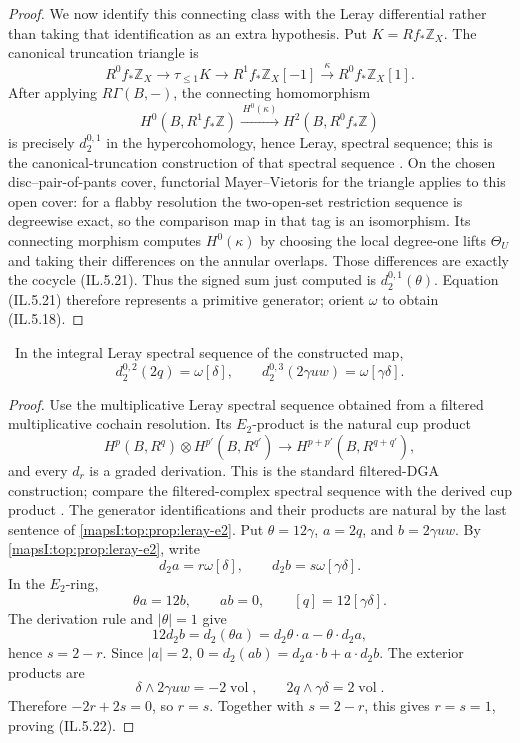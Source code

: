 \begin{proof}
We now identify this connecting class with the Leray differential rather
than taking that identification as an extra hypothesis.  Put
\(K=Rf_*\mathbb Z_X\).  The canonical truncation triangle
\cite[Tag~08J5]{StacksProject} is
\[
 R^0f_*\mathbb Z_X\longrightarrow\tau_{\le1}K
 \longrightarrow R^1f_*\mathbb Z_X[-1]
 \xrightarrow{\ \kappa\ }R^0f_*\mathbb Z_X[1].
\tag{IL.5.21a}
\]
After applying \(R\Gamma(B,-)\), the connecting homomorphism
\[
 H^0(B,R^1f_*\mathbb Z)\xrightarrow{\,H^0(\kappa)\,}
 H^2(B,R^0f_*\mathbb Z)
\tag{IL.5.21b}
\]
is precisely \(d_2^{0,1}\) in the hypercohomology, hence Leray, spectral
sequence; this is the canonical-truncation construction of that spectral
sequence \cite[Tag~0FLJ]{StacksProject}.  On the chosen disc--pair-of-pants
cover, functorial Mayer--Vietoris for the triangle
\cite[Tag~0F16]{StacksProject} applies to this open cover: for a flabby resolution the two-open-set
restriction sequence is degreewise exact, so the comparison map in that tag
is an isomorphism. Its connecting morphism computes $H^0(\kappa)$ by choosing the local
degree-one lifts \(\Theta_U\) and taking their differences on the annular
overlaps.  Those differences are exactly the cocycle (IL.5.21).  Thus the
signed sum just computed is \(d_2^{0,1}(\theta)\).
Equation (IL.5.21) therefore represents a primitive generator; orient \(\omega\)
to obtain (IL.5.18).
\end{proof}

\begin{lemma}
\label{mapsI:top:lem:higher-transgressions}
\ In the integral Leray spectral sequence of the constructed map,
\[
 d_2^{0,2}(2q)=\omega[\delta],
 \qquad
 d_2^{0,3}(2\gamma uw)=\omega[\gamma\delta].
\tag{IL.5.22}
\]
\end{lemma}

\begin{proof}
Use the multiplicative Leray spectral sequence obtained from a filtered
multiplicative cochain resolution.  Its \(E_2\)-product is the natural cup
product
\[
 H^p(B,R^q)\otimes H^{p'}(B,R^{q'})
 \longrightarrow H^{p+p'}(B,R^{q+q'}),
\]
and every \(d_r\) is a graded derivation.  This is the standard filtered-DGA
construction; compare the filtered-complex spectral sequence
\cite[Tags~012K and~0FLJ]{StacksProject} with the derived cup product
\cite[\S20.31]{StacksProject}.  The generator identifications and their
products are natural by the last sentence of
\cref{mapsI:top:prop:leray-e2}.
Put \(\theta=12\gamma\), \(a=2q\), and \(b=2\gamma uw\).  By
\cref{mapsI:top:prop:leray-e2}, write
\[
 d_2a=r\omega[\delta],\qquad d_2b=s\omega[\gamma\delta].
\]
In the \(E_2\)-ring,
\[
 \theta a=12b,\qquad ab=0,\qquad [q]=12[\gamma\delta].
\]
The derivation rule and \(|\theta|=1\) give
\[
12d_2b=d_2(\theta a)=d_2\theta\cdot a-\theta\cdot d_2a,
\]
hence \(s=2-r\).  Since \(|a|=2\),
\(0=d_2(ab)=d_2a\cdot b+a\cdot d_2b\).  The exterior products are
\[
 \delta\wedge2\gamma uw=-2\operatorname{vol},
 \qquad
 2q\wedge\gamma\delta=2\operatorname{vol}.
\]
Therefore \(-2r+2s=0\), so \(r=s\).  Together with \(s=2-r\), this gives
\(r=s=1\), proving (IL.5.22).
\end{proof}


